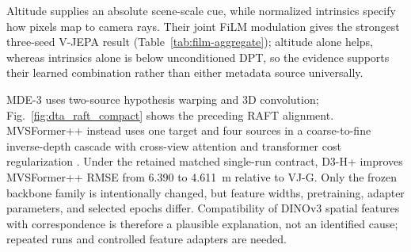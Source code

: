 Altitude supplies an absolute scene-scale cue, while normalized intrinsics specify how pixels map to camera rays. Their joint FiLM modulation gives the strongest three-seed V-JEPA result (Table~\ref{tab:film-aggregate}); altitude alone helps, whereas intrinsics alone is below unconditioned DPT, so the evidence supports their learned combination rather than either metadata source universally.

MDE-3 uses two-source hypothesis warping and 3D convolution; Fig.~\ref{fig:dta_raft_compact} shows the preceding RAFT alignment. MVSFormer++ instead uses one target and four sources in a coarse-to-fine inverse-depth cascade with cross-view attention and transformer cost regularization \cite{cao2024mvsformerpp}. Under the retained matched single-run contract, D3-H+ improves MVSFormer++ RMSE from 6.390 to 4.611~m relative to VJ-G. Only the frozen backbone family is intentionally changed, but feature widths, pretraining, adapter parameters, and selected epochs differ. Compatibility of DINOv3 spatial features with correspondence is therefore a plausible explanation, not an identified cause; repeated runs and controlled feature adapters are needed.

